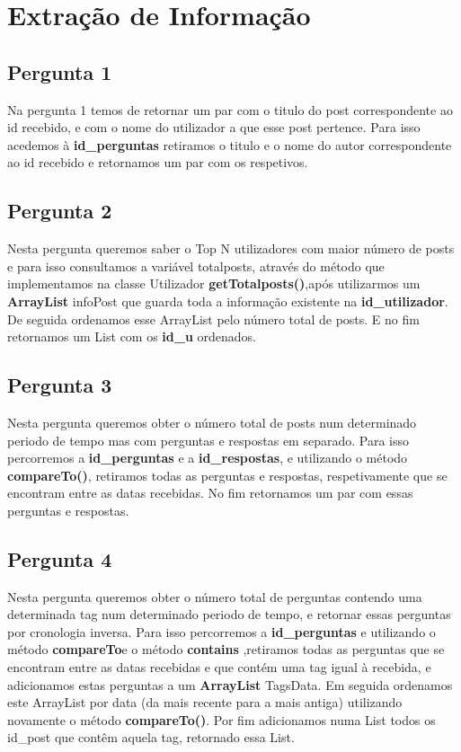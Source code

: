 \documentclass[a4paper]{article}
\begin{document}
	
\pagebreak
\section {Extração de Informação}

	\subsection{Pergunta 1}
	Na pergunta 1 temos de retornar um par com o titulo do post correspondente ao id recebido, e com o nome do utilizador a que esse post pertence. 
	Para isso acedemos à \textbf{id_perguntas} retiramos o titulo e o nome do autor correspondente ao id recebido e retornamos um par com os respetivos. 

	\subsection{Pergunta 2}
		Nesta pergunta queremos saber o Top N utilizadores com maior número de posts e para isso consultamos a variável totalposts, através do método que implementamos na classe Utilizador \textbf{getTotalposts()},após utilizarmos um \textbf{ArrayList} infoPost que guarda toda a informação existente na \textbf{id_utilizador}. De seguida ordenamos esse ArrayList pelo número total de posts. E no fim retornamos um List com os \textbf{id_u} ordenados.

	\subsection{Pergunta 3}
		Nesta pergunta queremos obter o número total de posts num determinado periodo de tempo mas com perguntas e respostas em separado. Para isso percorremos a \textbf{id_perguntas}  e a \textbf{id_respostas}, e utilizando o método \textbf{compareTo()}, retiramos todas as perguntas e respostas, respetivamente que se encontram entre as datas recebidas. No fim retornamos um par com essas perguntas e respostas.

	\subsection{Pergunta 4}
		Nesta pergunta queremos obter o número total de perguntas contendo uma determinada tag num determinado periodo de tempo, e retornar essas perguntas por cronologia inversa.
		Para isso percorremos a \textbf{id_perguntas} e utilizando o método \textbf{compareTo}e o método \textbf{contains} ,retiramos todas as perguntas que se encontram entre as datas recebidas e que contém uma tag igual à recebida, e adicionamos estas perguntas a um \textbf{ArrayList} TagsData. Em seguida ordenamos este ArrayList por data (da mais recente para a mais antiga) utilizando novamente o método \textbf{compareTo()}. Por fim adicionamos numa List todos os id_post que contêm aquela tag, retornado essa List.
\end{document}
